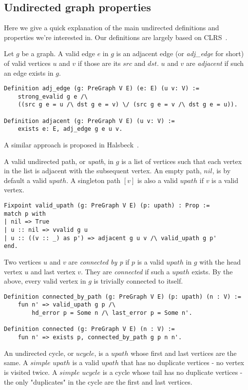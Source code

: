 \subsection{Undirected graph properties}

Here we give a quick explanation of the main undirected definitions and properties we're interested in. Our definitions are largely based on CLRS~\cite{clrs}.

Let $g$ be a graph. A valid edge $e$ in $g$ is an adjacent edge (or \textit{adj\_edge} for short) of valid vertices $u$ and $v$ if those are its $src$ and $dst$. $u$ and $v$ are \textit{adjacent} if such an edge exists in $g$.
\begin{lstlisting}
Definition adj_edge (g: PreGraph V E) (e: E) (u v: V) :=
	strong_evalid g e /\
	((src g e = u /\ dst g e = v) \/ (src g e = v /\ dst g e = u)).

Definition adjacent (g: PreGraph V E) (u v: V) :=
	exists e: E, adj_edge g e u v.
\end{lstlisting}
A similar approach is proposed in Halsbeck~\cite{DBLP:journals/afp/HaslbeckLB19}.

A valid undirected path, or \textit{upath}, in $g$ is a list of vertices such that each vertex in the list is adjacent with the subsequent vertex. An empty path, $nil$, is by default a valid $upath$. A singleton path $[v]$ is also a valid $upath$ if $v$ is a valid vertex.
\begin{lstlisting}
Fixpoint valid_upath (g: PreGraph V E) (p: upath) : Prop :=
match p with
| nil => True
| u :: nil => vvalid g u
| u :: ((v :: _) as p') => adjacent g u v /\ valid_upath g p'
end.
\end{lstlisting}
Two vertices $u$ and $v$ are \textit{connected by p} if $p$ is a valid $upath$ in $g$ with the head vertex $u$ and last vertex $v$. They are \textit{connected} if such a $upath$ exists. By the above, every valid vertex in $g$ is trivially connected to itself.
\begin{lstlisting}
Definition connected_by_path (g: PreGraph V E) (p: upath) (n : V) :=
	fun n' => valid_upath g p /\
		hd_error p = Some n /\ last_error p = Some n'.

Definition connected (g: PreGraph V E) (n : V) :=
	fun n' => exists p, connected_by_path g p n n'.
\end{lstlisting}
An undirected cycle, or $ucycle$, is a $upath$ whose first and last vertices are the same. A $simple$ $upath$ is a valid $upath$ that has no duplicate vertices - no vertex is visited twice. A $simple$ $ucycle$ is a cycle whose tail has no duplicate vertices - the only "duplicates" in the cycle are the first and last vertices.

